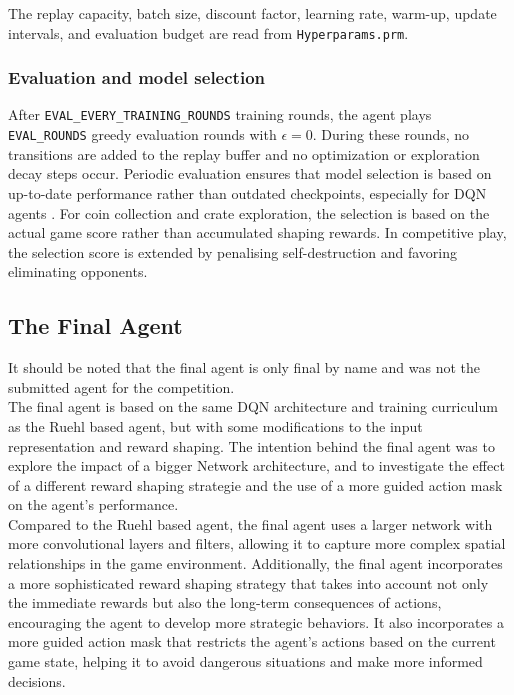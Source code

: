 \documentclass[11pt,a4paper]{article}
\begin{document}
The replay capacity, batch size, discount factor, learning rate, warm-up,
update intervals, and evaluation budget are read from \texttt{Hyperparams.prm}.

\subsubsection{Evaluation and model selection}
After \texttt{EVAL\_EVERY\_TRAINING\_ROUNDS} training rounds, the agent plays
\texttt{EVAL\_ROUNDS} greedy evaluation rounds with $\epsilon=0$. During
these rounds, no transitions are added to the replay buffer and no optimization or
exploration decay steps occur. 
Periodic evaluation ensures that model selection is based on up-to-date performance rather than outdated checkpoints, especially for DQN agents \citep{roderick2017implementing}.
For coin collection and crate exploration, the selection is based on the actual game score rather than accumulated shaping rewards. 
In competitive play, the selection score is extended by penalising self-destruction and favoring eliminating opponents.



\subsection{The Final Agent}

It should be noted that the final agent is only final by name and was not the submitted agent for the competition.\\
The final agent is based on the same DQN architecture and training curriculum as the Ruehl based agent, but with some modifications to the input representation and reward shaping. The intention behind the final agent was to explore the impact of a bigger Network architecture, and to investigate the effect of a different reward shaping strategie and the use of a more guided action mask on the agent's performance.\\
Compared to the Ruehl based agent, the final agent uses a larger network with more convolutional layers and filters, allowing it to capture more complex spatial relationships in the game environment. Additionally, the final agent incorporates a more sophisticated reward shaping strategy that takes into account not only the immediate rewards but also the long-term consequences of actions, encouraging the agent to develop more strategic behaviors. It also incorporates a more guided action mask that restricts the agent's actions based on the current game state, helping it to avoid dangerous situations and make more informed decisions.
\end{document}
